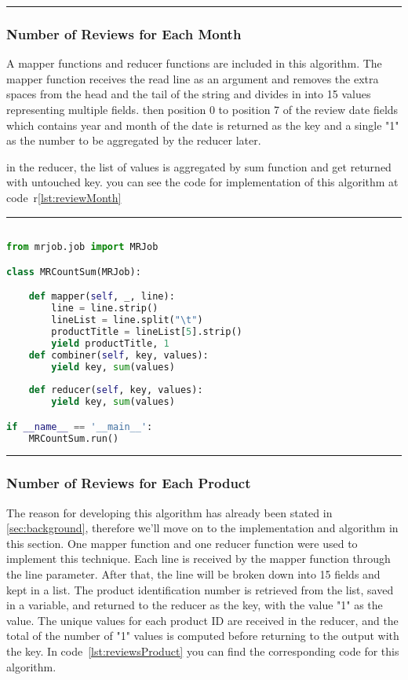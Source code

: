 \rule{200 pt}{0.5 pt} 

\subsubsection{Number of Reviews for Each Month}
A mapper functions and reducer functions are included in this algorithm. The mapper function receives the read line as an argument and removes the extra spaces from the head and the tail of the string and divides in into 15 values representing multiple fields. then position 0 to position 7 of the review date fields which contains year and month of the date is returned as the key and a single "1" as the number to be aggregated by the reducer later.

in the reducer, the list of values is aggregated by sum function and get returned with untouched key. you can see the code for implementation of this algorithm at code~r\ref{lst:reviewMonth}

\rule{200 pt}{0.5 pt} 

\renewcommand{\lstlistingname}{Code}
\lstset{style=mystyle}
\begin{lstlisting}[language=Python, caption={Number of Reviews for each month}, label={lst:reviewMonth}, mathescape = true, breaklines=true]

from mrjob.job import MRJob

class MRCountSum(MRJob):

    def mapper(self, _, line):
        line = line.strip()  
        lineList = line.split("\t")
        productTitle = lineList[5].strip()
        yield productTitle, 1
    def combiner(self, key, values):
        yield key, sum(values)
        
    def reducer(self, key, values):
        yield key, sum(values)

if __name__ == '__main__':
    MRCountSum.run()

\end{lstlisting}

\rule{200 pt}{0.5 pt} 

\subsubsection{Number of Reviews for Each Product}
The reason for developing this algorithm has already been stated in \ref{sec:background}, therefore we'll move on to the implementation and algorithm in this section. One mapper function and one reducer function were used to implement this technique. Each line is received by the mapper function through the line parameter. After that, the line will be broken down into 15 fields and kept in a list. The product identification number is retrieved from the list, saved in a variable, and returned to the reducer as the key, with the value "1" as the value. The unique values for each product ID are received in the reducer, and the total of the number of "1" values is computed before returning to the output with the key. In code~\ref{lst:reviewsProduct} you can find the corresponding code for this algorithm.


